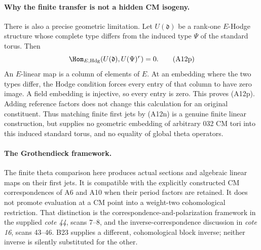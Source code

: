 \paragraph{Why the finite transfer is not a hidden CM isogeny.}
There is also a precise geometric limitation.  Let
$U(\mathfrak d)$ be a rank-one $E$-Hodge structure
whose complete type differs from the induced type
$\Psi$ of the standard torus.  Then
\[
           \Hom_{E,\mathrm{Hdg}}
                  (U(\mathfrak d),U(\Psi)^r)=0.
 \tag{A12p}
\]
An $E$-linear map is a column of elements of $E$.
At an embedding where the two types differ, the Hodge
condition forces every entry of that column to have
zero image.  A field embedding is injective, so every
entry is zero.  This proves (A12p).  Adding reference
factors does not change this calculation for an
original constituent.  Thus matching finite first
jets by (A12n) is a genuine finite linear construction,
but supplies no geometric embedding of arbitrary
032 CM tori into this induced standard torus, and
no equality of global theta operators.

\paragraph{The Grothendieck framework.}
The finite theta comparison here produces actual
sections and algebraic linear maps on their first
jets.  It is compatible with the explicitly constructed
CM correspondences of A6 and A10 when their period
factors are retained.  It does not promote evaluation
at a CM point into a weight-two cohomological restriction.
That distinction is the correspondence-and-polarization
framework in the supplied \emph{cote 44}, scans 7--8,
and the inverse-correspondence discussion in
\emph{cote 16}, scans 43--46.  B23 supplies a different,
cohomological block inverse; neither inverse is silently
substituted for the other.
